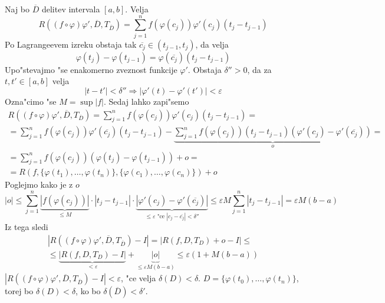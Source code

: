 Naj bo $\overline{D}$ delitev intervala $[a, b]$. Velja
\begin{equation*}
R((f \circ \varphi) \varphi', \overline{D}, T_{\overline{D}}) = \sum_{j = 1}^{n} f(\varphi(c_j)) \varphi'(c_j) (t_j - t_{j-1})
\end{equation*}
Po Lagrangeevem izreku obstaja tak $\overline{c_j} \in (t_{j-1}, t_j)$, da velja
\begin{equation*}
\varphi(t_j) - \varphi(t_{j-1}) = \varphi(\overline{c_j}) (t_j - t_{j-1})
\end{equation*}
Upo"stevajmo "se enakomerno zveznost funkcije $\varphi'$. Obstaja $\delta'' > 0$, da za $t, t' \in [a, b]$ velja
\begin{equation*}
|t - t'| < \delta'' \Rightarrow |\varphi'(t) - \varphi'(t')| < \varepsilon
\end{equation*}
Ozna"cimo "se $M = \sup |f|$. Sedaj lahko zapi"semo
\begin{multline*}
R((f \circ \varphi) \varphi', \overline{D}, T_{\overline{D}}) = \sum_{j=1}^n f(\varphi(c_j)) \varphi'(c_j) (t_j - t_{j-1}) = \\
= \sum_{j=1}^n f(\varphi(c_j)) \varphi'(\overline{c_j}) (t_j - t_{j-1}) - \underbrace{\sum_{j=1}^n f(\varphi(c_j)) (t_j - t_{j-1}) (\varphi'(c_j) - \varphi'(\overline{c_j}))}_o = \\
= \sum_{j=1}^n f(\varphi(c_j))(\varphi(t_j) - \varphi(t_{j-1})) + o = \\
= R \left( f, \{\varphi(t_1), \ldots, \varphi(t_n)\}, \{\varphi(c_1), \ldots, \varphi(c_n)\} \right) + o
\end{multline*}
Poglejmo kako je z $o$
\begin{equation*}
|o| \leq \sum_{j=1}^n \underbrace{|f(\varphi(c_j))|}_{\leq M} \cdot |t_j - t_{j-1}| \cdot \underbrace{|\varphi'(c_j) - \varphi'(\overline{c_j})|}_{\text{$\leq \varepsilon$ "ce $|c_j - \overline{c_j}| < \delta''$}} \leq \varepsilon M \sum_{j=1}^n |t_j - t_{j-1}| = \varepsilon M (b-a)
\end{equation*}
Iz tega sledi
\begin{multline*}
|R((f \circ \varphi) \varphi', \overline{D}, T_{\overline{D}}) -I| = |R(f, D, T_D) +o -I| \leq \\
 \leq \underbrace{|R(f, D, T_D) -I|}_{< \varepsilon} + \underbrace{|o|}_{\leq \varepsilon M (b-a)} \leq \varepsilon (1 + M (b-a))
\end{multline*}
$|R((f \circ \varphi) \varphi', \overline{D}, T_{\overline{D}}) -I| < \varepsilon$, "ce velja $\delta(D) < \delta$. $D = \{\varphi(t_0), \ldots, \varphi(t_n)\}$, torej bo $\delta(D) < \delta$, ko bo $\delta(\overline{D}) < \delta'$.

